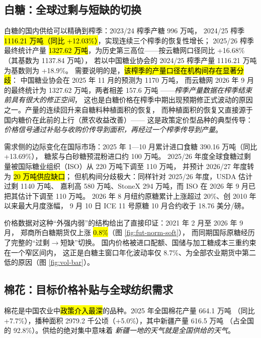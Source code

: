 \subsection{白糖：全球过剩与短缺的切换}
\label{sec:soft-sugar}

白糖的国内供给可以精确到榨季：2023/24 榨季产糖 996 万吨，
2024/25 榨季 \hl{1116.21 万吨（同比 +12.03\%）}，实现连续三个榨季的恢复性增长\cite{sugarassoc2025}；
2025/26 榨季最终统计产量 \hl{1327.62 万吨}，为历史第三高位——按云糖网口径同比 +16.68\%（其基数为 1137.84 万吨），
若以中国糖业协会的 2024/25 榨季产量 1116.21 万吨为基数则为 +18.9\%\cite{yuntang2026sugar}。
需要说明的是，\hl{该榨季的产量口径在机构间存在显著分歧}：
中国糖业协会在 2025 年 11 月的预测为 \num{1170} 万吨，
而云糖网 2026 年 9 月的最终统计为 \num{1327.62} 万吨，两者相差 \num{157.6} 万吨
——\emph{榨季产量数据在榨季结束前具有很大的修正空间}，
这也是白糖价格在榨季中期出现预期修正式波动的原因之一。产量的连续回升来自糖料种植面积的恢复，
而种植面积的恢复又直接源于国内糖价在此前的上行（蔗农收益改善）——
这是政策定价型品种的典型传导：\emph{价格信号通过补贴与收购价传导到面积，再经过一个榨季传导到产量}。

需求侧的边际变化在国际市场：2025 年 1---10 月累计进口食糖 390.16 万吨（同比 +13.69\%），
糖浆与白砂糖预混粉进口约 100 万吨\cite{yuntang2026sugar}。
2025/26 年度全球食糖过剩量被国际糖业组织（ISO）从 220 万吨下调至 110 万吨，
并预计 2026/27 年度转为 \hl{20 万吨供应缺口}\cite{moa2026sugar}；
但机构间分歧极大：同样针对 2025/26 年度，USDA 估计过剩 \num{1140} 万吨、
嘉利高 \num{580} 万吨、StoneX \num{294} 万吨，而 ISO 在 2026 年 9 月已把其估计下调至 \num{110} 万吨。
2026 年 8 月纽约原糖累计上涨超过 20\%、创 2010 年以来最大月度涨幅，
9 月 10 日 ICE 11 号原糖 10 月合约收于 18.76 美分/磅\cite{yuntang2026sugar}。

价格数据对这种“外强内弱”的结构给出了直接印证：2021 年 2 月至 2026 年 9 月，
郑商所白糖期货仅上涨 \hl{0.8\%}（图 \ref{fig:fut-norm-soft}），
而同期国际原糖经历了完整的“过剩$\to$短缺”切换。
国内价格被进口配额、国储与加工糖成本三重约束在一个窄区间内，
这正是白糖主窗口年化波动率仅 8.7\%、为全部农业期货中第二低的原因（图 \ref{fig:vol-bar}）。

\subsection{棉花：目标价格补贴与全球纺织需求}
\label{sec:soft-cotton}

棉花是中国农业中\hl{政策介入最深}的品种。2025 年全国棉花产量 664.1 万吨
（同比 +7.7\%），播种面积 2979.2 千公顷（+5.0\%），其中新疆产量 616.5 万吨
（占全国的 92.8\%）\cite{stats2025cotton}。供给的绝对集中意味着
\emph{新疆一地的天气就是全国供给的天气}。

